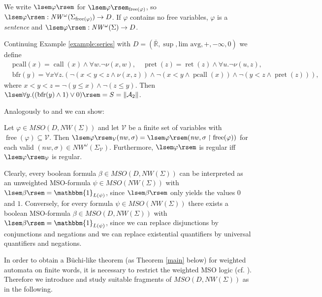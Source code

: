 \documentclass[runningheads, envcountsame, a4paper]{llncs}
\DeclareMathOperator{\free}{free}
\DeclareMathOperator{\call}{call}
\DeclareMathOperator{\ret}{ret}
\DeclareMathOperator{\pcall}{pcall}
\DeclareMathOperator{\pret}{pret}
\begin{document}
We write $\lsem \varphi \rsem$ for $\lsem \varphi \rsem_{\free(\varphi)}$, so
	$\lsem \varphi \rsem : \mathit{NW^\omega}(\Sigma_{\free(\varphi)}) \rightarrow D$.
If $\varphi$ contains no free variables, $\varphi$ is a \emph{sentence} and
	$\lsem \varphi \rsem : \mathit{NW^\omega}(\Sigma)\rightarrow D$.
\begin{example}
Continuing Example \ref{example:series} with $D=(\bar{\mathbb{R}},\sup,\text{lim avg},+,-\infty,0)$ we define \begin{align*}
&\mathrm{pcall}(x)=\call(x) \wedge \forall w.\neg\nu(x,w),\quad \pret(z)=\ret(z) \wedge \forall u.\neg\nu(u,z), \\
&\mathrm{bfr}(y)=\forall x \forall z.(\neg(x<y<z \wedge \nu(x,z)) \wedge \neg(x<y \wedge \pcall(x)) \wedge \neg(y<z \wedge \pret(z))) ,
\end{align*}
where $x<y<z=\neg(y\le x)\wedge\neg(z\le y)$. Then $\lsem \forall y.((\mathrm{bfr}(y)\wedge 1)\vee 0) \rsem = S =\lVert \mathcal{A}_2 \rVert$.
\end{example}
\par Analogously to \cite{DG} and \cite{DP} we can show:
\begin{Satz}
\label{prop:consistency}
	Let $\varphi \in \mathit{MSO}(D, \mathit{NW}(\Sigma))$ and let $\mathcal{V}$ be a finite set of variables with $\free(\varphi) \subseteq \mathcal{V}$. Then $\lsem \varphi \rsem_{\mathcal{V}}(\mathit{nw},\sigma)= \lsem \varphi \rsem(\mathit{nw},\sigma\restriction \free(\varphi))$ for each valid $(\mathit{nw},\sigma)\in \mathit{NW^\omega}(\Sigma_\mathcal{V})$. Furthermore, $\lsem \varphi \rsem$ is regular iff $\lsem \varphi \rsem_{\mathcal{V}}$ is regular. 
\end{Satz}
\par
Clearly, every boolean formula $\beta \in \mathit{MSO}(D, \mathit{NW}(\Sigma))$ can be interpreted as an unweighted MSO-formula $\psi \in \mathit{MSO}(\mathit{NW}(\Sigma))$ with $\lsem\beta \rsem=\mathbbm{1}_{L(\psi)}$, since $\lsem \beta \rsem$ only yields the values $0$ and $1$.
Conversely, for every formula $\psi \in \mathit{MSO}(\mathit{NW}(\Sigma))$ there exists a boolean MSO-formula $\beta \in \mathit{MSO}(D, \mathit{NW}(\Sigma))$ with $\lsem \beta \rsem=\mathbbm{1}_{L(\psi)}$, since we can replace disjunctions by conjunctions and negations and we can replace existential quantifiers by universal quantifiers and negations.
\par
In order to obtain a B\"uchi-like theorem (as Theorem \ref{main} below) for weighted automata on finite words, it is necessary to restrict the weighted MSO logic (cf. \cite{DG}). Therefore we introduce and study suitable fragments of $\mathit{MSO}(D, \mathit{NW}(\Sigma))$ as in the following.
\end{document}
